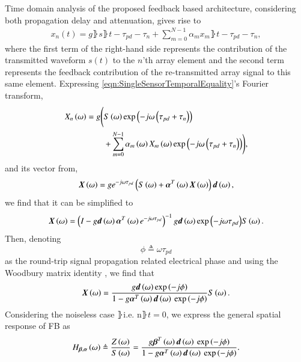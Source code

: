 Time domain analysis of the proposed feedback based architecture, considering both propagation delay and attenuation, gives rise to
\begin{equation}
    \label{eqn:SingleSensorTemporalEquality}
        \begin{split}
            x_{n}(t) = g\rBrace{s\rBrace{t-\tau_{pd}-\tau_{n}}
            +\sum_{m=0}^{N-1}{\alpha_{m}x_{m}\rBrace{t-\tau_{pd}-\tau_{n}}}},
        \end{split}
\end{equation}
where the first term of the right-hand side represents the contribution of the transmitted waveform $s(t)$ to the $n$'th array element and the second term represents the feedback contribution of the re-transmitted array signal to this same element.
Expressing \eqref{eqn:SingleSensorTemporalEquality}'s Fourier transform,
\begin{equation}
    \label{eqn_singleSensorFourier}
        \begin{split}
            \F{x}_{n}\rBrace{\omega} =
            g\Bigg( & \F{s}\rBrace{\omega}
            \exp\rBrace{-j\omega\rBrace{\tau_{pd}+\tau_{n}}}
            \\&+\sum_{m=0}^{N-1}
            {
            \alpha_{m}\rBrace{\omega}\F{x}_{m}\rBrace{\omega}
            \exp\rBrace{-j\omega\rBrace{\tau_{pd}+\tau_{n}}}
            }\Bigg),
        \end{split}
\end{equation}
and its vector from,
$$
\F{\vx}\rBrace{\omega} = ge^{-j\omega\tau_{pd}} \rBrace{\F{s}\rBrace{\omega}+\vAlphaT \F{\vx}\rBrace{\omega}}\vd,
$$
we find that it can be simplified to
$$
\F{\vx}\rBrace{\omega} =\rBrace{I-g\vd\vAlphaT{}e^{-j\omega\tau_{pd}}}^{-1}g\vd\exp{\rBrace{-j\omega\tau_{pd}}}\F{s}\rBrace{\omega}.
$$
Then, denoting
\[
\phi\triangleq\omega\tau_{pd}
\]
as the round-trip signal propagation related electrical phase and using the Woodbury matrix identity \cite{woodbury1950inverting}, we find that
$$
\F{\vx}\rBrace{\omega}
=
\frac{    
g\vd\exp{\rBrace{-j\phi}}
}{
1 - g\aTd{}\exp{\rBrace{-j\phi}}
}\F{s}\rBrace{\omega}.
$$
Considering the noiseless case $\rBrace{\text{i.e. n}\rBrace{t}=0}$,
we express the general spatial response of FB as 
\begin{equation}
\label{eqn:GeneralFeedbackTransferFunction}
\Hba
\triangleq
\frac{\F{z}\rBrace{\omega}}{\F{s}\rBrace{\omega}} 
=
\frac{    
g\bTd{}\exp\rBrace{-j\phi}
}{
1 - g\aTd{}\exp\rBrace{-j\phi}
}.
\end{equation}
